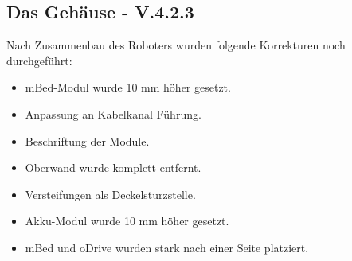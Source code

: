 \subsection{Das Gehäuse - V.4.2.3}

Nach Zusammenbau des Roboters wurden folgende Korrekturen noch durchgeführt:
 
\begin{itemize} 
	\item  mBed-Modul wurde 10 mm höher gesetzt.
	\item  Anpassung an Kabelkanal Führung.
	\item  Beschriftung der Module.
	\item  Oberwand wurde komplett entfernt.
	\item  Versteifungen als Deckelsturzstelle.
	\item  Akku-Modul wurde 10 mm höher gesetzt.
	\item  mBed und oDrive wurden stark nach einer Seite platziert.
\end{itemize}

